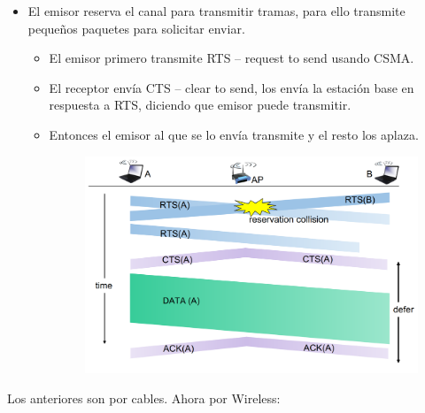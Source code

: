 \documentclass[12pt, twoside, openright]{report} %
\begin{document}
\begin{itemize}
	\item El emisor reserva el canal para transmitir tramas, para ello
	      transmite pequeños paquetes para solicitar enviar.

	      \begin{itemize}
		      \item El emisor primero transmite RTS -- request to send usando
		            CSMA.
		      \item El receptor envía CTS -- clear to send, los envía la
		            estación base en respuesta a RTS, diciendo que emisor
		            puede transmitir.
		      \item Entonces el emisor al que se lo envía transmite y el resto
		            los aplaza.
		            \begin{figure}[H]
			            {\includegraphics[scale=.25]{Untitled 53.png}}
		            \end{figure}
	      \end{itemize}
\end{itemize}

Los anteriores son por cables. Ahora por Wireless:
\end{document}
